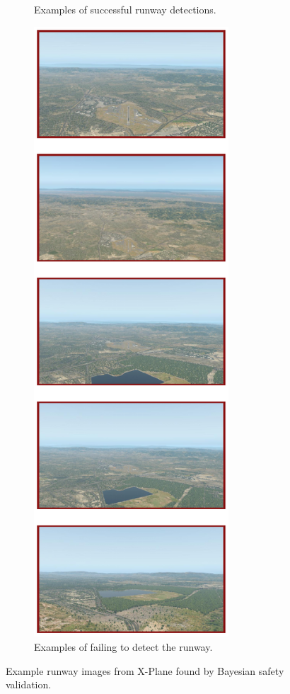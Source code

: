 \begin{figure}[p]
\begin{subfigure}[b]{0.48\textwidth}
        \caption{Examples of successful runway detections.}
        \label{fig:rwd_successes}
    \end{subfigure}
    \hfill
    \begin{subfigure}[b]{0.48\textwidth}
        \centering
        \includegraphics[width=0.8\textwidth]{figures/bsv/rwd/rwd-failures.pdf}
        \caption{Examples of failing to detect the runway.}
        \label{fig:rwd_failures}
    \end{subfigure}

    \caption{Example runway images from X-Plane found by Bayesian safety validation.}
    \label{fig:rwd_successes_and_failures}
\end{figure}


